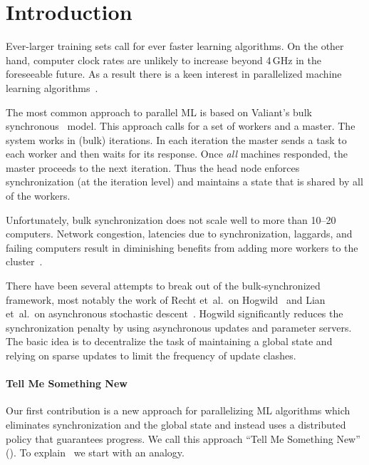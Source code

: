 \section{Introduction}\label{sec:intro}

Ever-larger training sets call for ever faster learning algorithms.
On the other hand, computer clock rates are unlikely to increase
beyond 4\,GHz in the foreseeable future.  As a result there is a keen
interest in parallelized machine
learning algorithms~\cite{bekkerman_scaling_2012}.

The most common approach to parallel ML is based on Valiant's bulk
synchronous~\cite{valiant_bridging_1990} model. This approach calls for a
set of workers and a master. The system works in (bulk) iterations. In each iteration
the master sends a task to each worker and then waits for its
response. Once {\em all} machines responded, the master proceeds to the
next iteration. Thus the head node enforces synchronization (at the
iteration level) and maintains
a state that is shared by all of the workers.

Unfortunately, bulk synchronization does not scale well to more than
10--20 computers. Network congestion, latencies due to synchronization,
laggards, and failing computers result in diminishing benefits from
adding more workers to the
cluster~\cite{zaharia_apache_2016,mcsherry_scalability!_2015}.

There have been several attempts to break out of the bulk-synchronized
framework, most notably the work of Recht et~al.\ on
Hogwild~\cite{recht_hogwild:_2011} and Lian et~al.\ on asynchronous stochastic descent~\cite{lian_asynchronous_2015}. Hogwild
significantly reduces the synchronization penalty by using
asynchronous updates and parameter servers. The basic idea is to
decentralize the task of maintaining a global state and relying on
sparse updates to limit the frequency of update clashes.

\paragraph{Tell Me Something New}

Our first contribution is a new approach for parallelizing ML algorithms
which eliminates synchronization and the global state and instead uses a
distributed policy that guarantees progress. We call this approach
``Tell Me Something New'' (\tmsn). To explain \tmsn\ we start with an
analogy.

